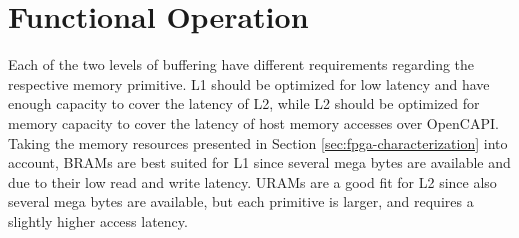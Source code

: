 






\section{Functional Operation}
\label{sec:funcop}
Each of the two levels of buffering have different requirements regarding the respective memory primitive. L1 should be optimized for low latency and have enough capacity to cover the latency of L2, while L2 should be optimized for memory capacity to cover the latency of host memory accesses over OpenCAPI. Taking the memory resources presented in Section \ref{sec:fpga-characterization} into account, BRAMs are best suited for L1 since several mega bytes are available and due to their low read and write latency. URAMs are a good fit for L2 since also several mega bytes are available, but each primitive is larger, and requires a slightly higher access latency.



